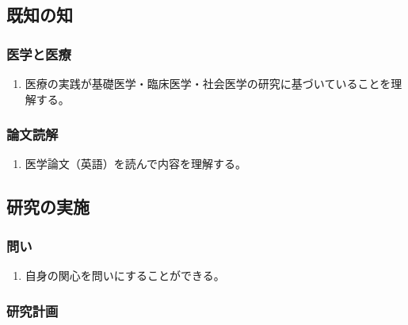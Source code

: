 \hypertarget{ux65e2ux77e5ux306eux77e5}{%
\subsection{既知の知}\label{ux65e2ux77e5ux306eux77e5}}

\hypertarget{ux533bux5b66ux3068ux533bux7642}{%
\subsubsection{医学と医療}\label{ux533bux5b66ux3068ux533bux7642}}

\begin{enumerate}
\def\labelenumi{\arabic{enumi}.}
\tightlist
\item
  医療の実践が基礎医学・臨床医学・社会医学の研究に基づいていることを理解する。
\end{enumerate}

\hypertarget{ux8ad6ux6587ux8aadux89e3}{%
\subsubsection{論文読解}\label{ux8ad6ux6587ux8aadux89e3}}

\begin{enumerate}
\def\labelenumi{\arabic{enumi}.}
\tightlist
\item
  医学論文（英語）を読んで内容を理解する。
\end{enumerate}

\hypertarget{ux7814ux7a76ux306eux5b9fux65bd}{%
\subsection{研究の実施}\label{ux7814ux7a76ux306eux5b9fux65bd}}

\hypertarget{ux554fux3044}{%
\subsubsection{問い}\label{ux554fux3044}}

\begin{enumerate}
\def\labelenumi{\arabic{enumi}.}
\tightlist
\item
  自身の関心を問いにすることができる。
\end{enumerate}

\hypertarget{ux7814ux7a76ux8a08ux753b}{%
\subsubsection{研究計画}\label{ux7814ux7a76ux8a08ux753b}}

